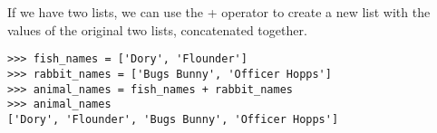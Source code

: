 If we have two lists, we can use the + operator to create a new list with the
values of the original two lists, concatenated together.

\begin{lstlisting}
>>> fish_names = ['Dory', 'Flounder']
>>> rabbit_names = ['Bugs Bunny', 'Officer Hopps']
>>> animal_names = fish_names + rabbit_names
>>> animal_names
['Dory', 'Flounder', 'Bugs Bunny', 'Officer Hopps']
\end{lstlisting}
